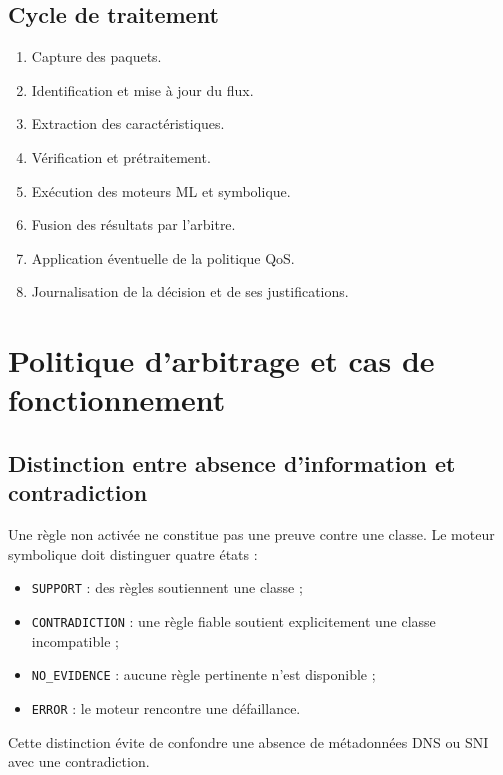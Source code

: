 \subsection{Cycle de traitement}

\begin{enumerate}
    \item Capture des paquets.
    \item Identification et mise à jour du flux.
    \item Extraction des caractéristiques.
    \item Vérification et prétraitement.
    \item Exécution des moteurs ML et symbolique.
    \item Fusion des résultats par l'arbitre.
    \item Application éventuelle de la politique QoS.
    \item Journalisation de la décision et de ses justifications.
\end{enumerate}

\section{Politique d'arbitrage et cas de fonctionnement}

\subsection{Distinction entre absence d'information et contradiction}

Une règle non activée ne constitue pas une preuve contre
une classe. Le moteur symbolique doit distinguer quatre états :

\begin{itemize}
    \item \texttt{SUPPORT} : des règles soutiennent une classe ;
    \item \texttt{CONTRADICTION} : une règle fiable soutient
    explicitement une classe incompatible ;
    \item \texttt{NO\_EVIDENCE} : aucune règle pertinente
    n'est disponible ;
    \item \texttt{ERROR} : le moteur rencontre une défaillance.
\end{itemize}

Cette distinction évite de confondre une absence de métadonnées
DNS ou SNI avec une contradiction.

